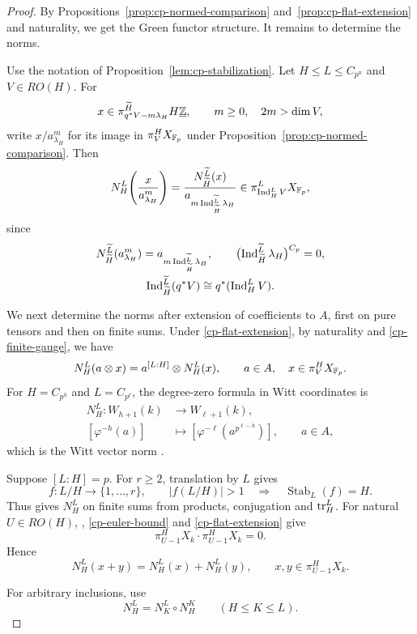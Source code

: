 \begin{proof}
By Propositions~\ref{prop:cp-normed-comparison}
and~\ref{prop:cp-flat-extension} and naturality, we get the Green functor structure.
It remains to determine the norms.

Use the notation of Proposition~\ref{lem:cp-stabilization}.
Let $H\le L\le C_{p^n}$ and $V\in RO(H)$.
For
\[
x\in\pi_{q^*V-m\lambda_H}^{\widetilde H}H\underline{\mathbb Z},
\qquad m\ge0,\quad 2m>\dim V,
\]
write $x/a_{\lambda_H}^m$ for its image
in $\pi_V^H X_{\mathbb F_p}$ under
Proposition~\ref{prop:cp-normed-comparison}.
Then
\[
N_H^L\!\left(\frac{x}{a_{\lambda_H}^m}\right)
=
\frac{N_{\widetilde H}^{\widetilde L}(x)}
     {a_{m\operatorname{Ind}_{\widetilde H}^{\widetilde L}\lambda_H}}
\in\pi_{\operatorname{Ind}_H^L V}^L X_{\mathbb F_p},
\]
since
\[
\begin{gathered}
N_{\widetilde H}^{\widetilde L}(a_{\lambda_H}^m)
=
a_{m\operatorname{Ind}_{\widetilde H}^{\widetilde L}\lambda_H},
\qquad
\bigl(\operatorname{Ind}_{\widetilde H}^{\widetilde L}\lambda_H\bigr)^{C_p}=0,
\\
\operatorname{Ind}_{\widetilde H}^{\widetilde L}(q^*V)
\cong q^*(\operatorname{Ind}_H^L V).
\end{gathered}
\]

We next determine the norms after extension of coefficients to $A$,
first on pure tensors and then on finite sums.
Under \eqref{cp-flat-extension}, by naturality and \eqref{cp-finite-gauge}, we have
\[
N_H^L(a\otimes x)
=
a^{[L:H]}\otimes N_H^L(x),
\qquad
a\in A,\quad x\in\pi_V^H X_{\mathbb F_p}.
\]
For $H=C_{p^h}$ and $L=C_{p^\ell}$, the degree-zero formula
in Witt coordinates is
\[
\begin{aligned}
N_H^L:W_{h+1}(k)&\longrightarrow W_{\ell+1}(k),\\
[\varphi^{-h}(a)]&\longmapsto
[\varphi^{-\ell}(a^{p^{\ell-h}})],
\qquad a\in A,
\end{aligned}
\]
which is the Witt vector norm
\cite[Theorem~4.1]{WittNorm}.

Suppose $[L:H]=p$. For $r\ge2$, translation by $L$ gives
\[
f:L/H\longrightarrow\{1,\ldots,r\},
\qquad |f(L/H)|>1
\quad\Longrightarrow\quad
\operatorname{Stab}_L(f)=H.
\]
Thus \cite[(8.34)]{ZhangHZ} gives $N_H^L$ on finite sums
from products, conjugation and $\operatorname{tr}_H^L$.
For natural $U\in RO(H)$,
\cite[Proposition~6.10]{ZhangHZ},
\eqref{cp-euler-bound} and \eqref{cp-flat-extension} give
\[
\pi_{U-1}^H X_k\cdot\pi_{U-1}^H X_k=0.
\]
Hence
\[
N_H^L(x+y)=N_H^L(x)+N_H^L(y),
\qquad x,y\in\pi_{U-1}^H X_k.
\]

For arbitrary inclusions, use
\[
N_H^L=N_K^L\circ N_H^K
\qquad(H\le K\le L).
\]
\end{proof}

